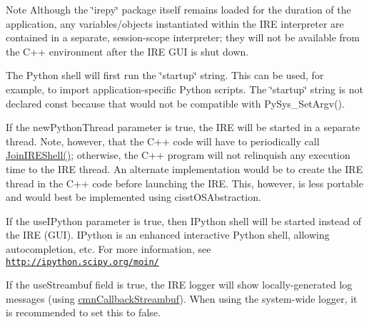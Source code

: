 \begin{DoxyNote}{Note}
Although the \char`\"{}irepy\char`\"{} package itself remains loaded for the duration of the application, any variables/objects instantiated within the I\-R\-E interpreter are contained in a separate, session-\/scope interpreter; they will not be available from the C++ environment after the I\-R\-E G\-U\-I is shut down.
\end{DoxyNote}
The Python shell will first run the \char`\"{}startup\char`\"{} string. This can be used, for example, to import application-\/specific Python scripts. The \char`\"{}startup\char`\"{} string is not declared const because that would not be compatible with Py\-Sys\-\_\-\-Set\-Argv().

If the new\-Python\-Thread parameter is true, the I\-R\-E will be started in a separate thread. Note, however, that the C++ code will have to periodically call \hyperlink{classire_framework_a272dfb38dadc652b543493a608061399}{Join\-I\-R\-E\-Shell()}; otherwise, the C++ program will not relinquish any execution time to the I\-R\-E thread. An alternate implementation would be to create the I\-R\-E thread in the C++ code before launching the I\-R\-E. This, however, is less portable and would best be implemented using cisst\-O\-S\-Abstraction.

If the use\-I\-Python parameter is true, then I\-Python shell will be started instead of the I\-R\-E (G\-U\-I). I\-Python is an enhanced interactive Python shell, allowing autocompletion, etc. For more information, see \href{http://ipython.scipy.org/moin/}{\tt http\-://ipython.\-scipy.\-org/moin/}

If the use\-Streambuf field is true, the I\-R\-E logger will show locally-\/generated log messages (using \hyperlink{classcmn_callback_streambuf}{cmn\-Callback\-Streambuf}). When using the system-\/wide logger, it is recommended to set this to false.


